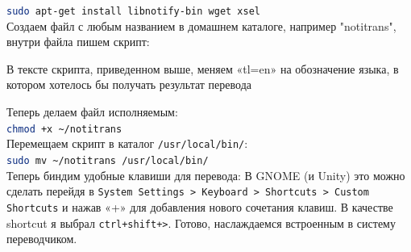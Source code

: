 \documentclass[a4paper, 12pt]{report}
\begin{document}
\lstinline[language=sh]{sudo apt-get install libnotify-bin wget xsel}\\

Создаем файл с любым названием в домашнем каталоге, например "notitrans", внутри файла пишем скрипт:



В тексте скрипта, приведенном выше, меняем «tl=en» на обозначение языка, в котором хотелось бы получать результат перевода

Теперь делаем файл исполняемым:\\
\lstinline[language=sh]{chmod +x ~/notitrans}\\

Перемещаем скрипт в каталог \lstinline|/usr/local/bin/|:\\
\lstinline[language=sh]{sudo mv ~/notitrans /usr/local/bin/}\\

Теперь биндим удобные клавиши для перевода:
В GNOME (и Unity) это можно сделать перейдя в \lstinline|System Settings > Keyboard > Shortcuts > Custom Shortcuts| и нажав «+» для добавления нового сочетания клавиш. В качестве shortcut я выбрал \lstinline|ctrl+shift+>|. Готово, наслаждаемся встроенным в систему переводчиком.
\end{document}
